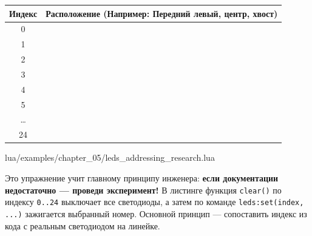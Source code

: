 \begin{center}
\renewcommand{\arraystretch}{1.5}
\begin{tabular}{|c|p{8cm}|}
\hline
\rowcolor{GeoskanBlue!20} \textbf{Индекс} & \textbf{Расположение (Например: Передний левый, центр, хвост)} \\
\hline
0 & \dotfill \\
\hline
1 & \dotfill \\
\hline
2 & \dotfill \\
\hline
3 & \dotfill \\
\hline
4 & \dotfill \\
\hline
5 & \dotfill \\
\hline
\dots & \dotfill \\
\hline
24 & \dotfill \\
\hline
\end{tabular}
\end{center}

\begin{codebox}
\begin{codefile}{lua/examples/chapter_05/leds_addressing_research.lua}
\end{codefile}
\end{codebox}

Это упражнение учит главному принципу инженера: \textbf{если документации недостаточно — проведи эксперимент!} В листинге функция \verb|clear()| по индексу \verb|0..24| выключает все светодиоды, а затем по команде \verb|leds:set(index, ...)| зажигается выбранный номер. Основной принцип — сопоставить индекс из кода с реальным светодиодом на линейке.
